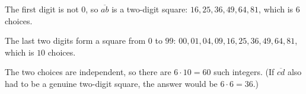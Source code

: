 The first digit is not $0$, so $\overline{ab}$ is a two-digit square: $16,25,36,49,64,81$, which is $6$ choices.

The last two digits form a square from $0$ to $99$: $00,01,04,09,16,25,36,49,64,81$, which is $10$ choices.

The two choices are independent, so there are $6\cdot10=\boxed{60}$ such integers. (If $\overline{cd}$ also had to be a genuine two-digit square, the answer would be $6\cdot6=36$.)
